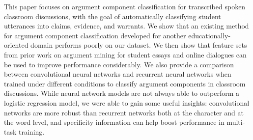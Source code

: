 This paper focuses on argument component classification for transcribed spoken classroom discussions, with the goal of automatically classifying student utterances into claims, evidence, and warrants. We show that an existing method for argument component classification developed for another educationally-oriented domain performs poorly on our dataset. We then show that feature sets from prior work on argument mining for student essays and online dialogues can be used to improve performance considerably. We also provide a comparison between convolutional neural networks and recurrent neural networks when trained under different conditions to classify argument components in classroom discussions. While neural network models are not always able to outperform a logistic regression model, we were able to gain some useful insights: convolutional networks are more robust than recurrent networks both at the character and at the word level, and specificity information can help boost performance in multi-task training.
